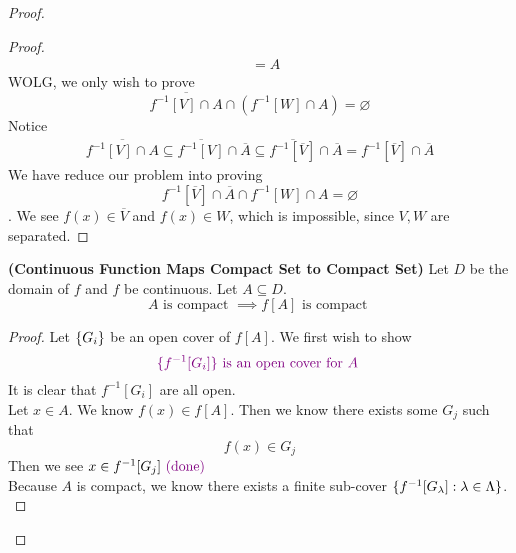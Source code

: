 \documentclass{report}
\begin{document}
\begin{proof}
\begin{proof}
\begin{align*}
  &=A
\end{align*}
WOLG, we only wish to prove
\begin{equation*}
\overline{f^{-1}[V]\cap A}\cap (f^{-1}[W]\cap A)=\varnothing
\end{equation*}
Notice
\begin{align*}
  \overline{f^{-1}[V]\cap A}\subseteq \overline{f^{-1}[V]}\cap \overline{A}\subseteq \overline{f^{-1}[\overline{V}]}\cap \overline{A}=f^{-1}[\overline{V}]\cap \overline{A}
\end{align*}
We have reduce our problem into proving 
\begin{equation*}
f^{-1}[\overline{V}]\cap \overline{A}\cap f^{-1}[W]\cap A=\varnothing
\end{equation*}
. We see $f(x)\in \overline{V}$ and $f(x)\in W$, which is impossible, since $V,W$ are separated.  \CaC
\end{proof}
\begin{theorem}
\label{2.4.7}
\textbf{(Continuous Function Maps Compact Set to Compact Set)} Let $D$ be the domain of $f$ and $f$ be continuous. Let $A\subseteq D$.
\begin{equation*}
A\text{ is compact }\implies f[A]\text{ is compact }
\end{equation*}
\end{theorem}
\begin{proof}
Let $\{ G_i \}$ be an open cover of $f[A]$. We first wish to show
\begin{equation*}
  \textcolor{violet}{\{ f^{-1}[G_i] \}\text{ is an open cover for $A$ }}
\end{equation*}
It is clear that $f^{-1}[G_i]$ are all open.\\

Let $x\in A$. We know $f(x)\in f[A]$. Then we know there exists some $G_j$ such that 
 \begin{equation*}
f(x)\in G_j
\end{equation*}
Then we see $x\in f^{-1}[G_j]\textcolor{violet}{\text{ (done) }}$\\

Because $A$ is compact, we know there exists a finite sub-cover  $\{ f^{-1}[G_\lambda] :\lambda  \in \Lambda  \}$.\\


\end{proof}
\end{proof}
\end{document}
